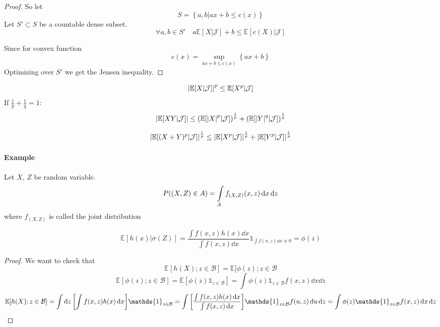 \begin{prop}
	\begin{proof}
		So let
		$$S = \left\{ a,b | ax+b\leq c(x) \right\} $$
		Let $S'\subset S$ be a countable dense subset.
		$$\forall a,b\in S' \quad a\mathbb{E} [X|\mathcal{J}] +b \leq \mathbb{E} [c(X)|\mathcal{J}]$$
		
		Since for convex function
		$$c(x) = \sup\limits_{ax+b\leq c(x)} \left\{ ax+b \right\}$$
		Optimizing over $S'$ we get the Jensen inequality.
	\end{proof}
\end{prop}
\begin{prop}
	$$\abs{\mathbb{E} [X|\mathcal{J}]}^{p} \leq \mathbb{E} [X^p|\mathcal{J}]$$
	If $\frac{1}{p}+\frac{1}{q}=1$:
	$$\abs{\mathbb{E} [XY|\mathcal{J}]} \leq \qty(\mathbb{E} [\abs{X}^p|\mathcal{J}])^{\frac{1}{p}} + \qty(\mathbb{E} [\abs{Y}^q|\mathcal{J}])^{\frac{1}{q}}$$
\end{prop}
\begin{prop}
$$\abs{\mathbb{E} [(X+Y)^p|\mathcal{J}]}^{\frac{1}{p}} \leq \abs{\mathbb{E} [X^p|\mathcal{J}]}^{\frac{1}{p}} + \abs{\mathbb{E} [Y^p|\mathcal{J}]}^{\frac{1}{p}}$$
\end{prop}


\paragraph{Example}
Let $X$, $Z$ be random variable.
$$P\qty((X,Z)\in A) = \int\limits_A f_{(X,Z)} (x,z) \dd{x} \dd{z}$$
where $f_{(X,Z)} $ is called the joint distribution

\begin{prop}
$$\mathbb{E}[h(x) | \sigma(Z)] = \frac{\int f(x,z) h(x) \dd{x}}{\int f(x,z) \dd{x}} \mathds{1}_{\int f(x,z) \dd{x} \neq 0} = \phi(z)$$

\begin{proof}
	We want to check that
$$\mathbb{E}[h(X); z\in \mathcal{B} ] =\mathbb{E}[\phi(z); z\in \mathcal{B}$$
$$\mathbb{E}[\phi(z); z\in \mathcal{B} ]=\mathbb{E}[\phi(z)\mathds{1}_{z\in \mathcal{B}}] = \int  \phi(z) \mathds{1}_{z\in \mathcal{B}} f(x,z) \dd{x} \dd{z} $$
$$\mathbb{E}[h(X); z\in \mathcal{B} ]  = \int \dd{z} \qty[\int f(x,z) h(x) \dd{x}] \mathds{1}_{z\in \mathcal{B}} = \int \qty[\frac{\int f(x,z) h(x) \dd{x}}{\int f(x,z) \dd{x}}]  \mathds{1}_{z\in \mathcal{B}} f(u,z)\dd{u}\dd{z} = \int  \phi(z) \mathds{1}_{z\in \mathcal{B}} f(x,z) \dd{x} \dd{z} $$
\end{proof}
\end{prop}

